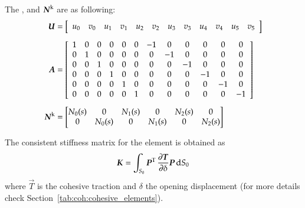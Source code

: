 The ,  and $\boldsymbol{N}^\mathrm{k}$ are as following:
\begin{align}
  \boldsymbol{U} &= \left [
    \begin{array}{c c c c c c c c c c c c}
      u_0 & v_0 & u_1 & v_1 & u_2 & v_2 & u_3 & v_3 & u_4 & v_4 & u_5 & v_5
    \end{array}\right ]\\[1ex]
  \boldsymbol{A} &= \left [\begin{array}{c c c c c c c c c c c c}
      1 & 0 & 0 & 0& 0 & 0 & -1& 0 & 0 &0 &0 &0\\
      0 &1& 0&0 &0 &0 &0 & -1& 0& 0 & 0 &0\\
      0 &0& 1&0 &0 &0 &0 & 0& -1& 0 & 0 &0\\
      0 &0& 0&1 &0 &0 &0 & 0& 0& -1 & 0 &0\\
      0 &0& 0&0 &1 &0 &0 & 0& 0& 0 & -1 &0\\
      0 &0& 0&0 &0 &1 &0 & 0& 0& 0 & 0 &-1
    \end{array} \right ]\\[1ex]
  \boldsymbol{N}^\mathrm{k} &= \begin{bmatrix}
    N_0(s) & 0 & N_1(s) &0 & N_2(s) & 0\\
    0 & N_0(s)& 0 &N_1(s)& 0 & N_2(s)
  \end{bmatrix}
\end{align}

The consistent stiffness matrix for the element is obtained as
\begin{equation}
  \label{eq:cohesive_stiffness}
  \boldsymbol{K}    =    \int_{S_0}    \boldsymbol{P}^\mathrm{T}\,
    \frac{\partial{\ensuremath{\boldsymbol{T}}}} {\partial{\delta}} \boldsymbol{P} \,\mathrm{d}
    S_0
\end{equation}
where $\vec{T}$ is the cohesive traction and $\delta$ the opening
displacement (for more details check
Section~\ref{tab:coh:cohesive_elements}).



